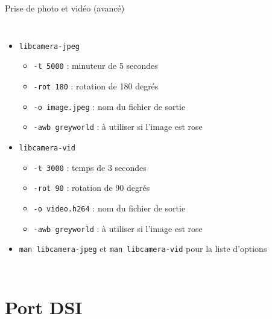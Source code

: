 \documentclass[aspectratio=169,xcolor=dvipsnames]{beamer}
\begin{document}
\begin{frame}{Prise de photo et vidéo (avancé)}
    \begin{columns}[c] %

        \begin{itemize}
            \item \texttt{libcamera-jpeg}
            \begin{itemize}
                \item \texttt{-t 5000} : minuteur de 5 secondes
                \item \texttt{-rot 180} : rotation de 180 degrés
                \item \texttt{-o image.jpeg} : nom du fichier de sortie
                \item \texttt{-awb greyworld} : à utiliser si l'image est rose
            \end{itemize}
            \item \texttt{libcamera-vid}
            \begin{itemize}
                \item \texttt{-t 3000} : temps de 3 secondes
                \item \texttt{-rot 90} : rotation de 90 degrés
                \item \texttt{-o video.h264} : nom du fichier de sortie
                \item \texttt{-awb greyworld} : à utiliser si l'image est rose
            \end{itemize}
            \item \texttt{man libcamera-jpeg} et \texttt{man libcamera-vid} pour la liste d'options
        \end{itemize}

    \end{columns}
\end{frame}


\section{Port DSI}
\end{document}
